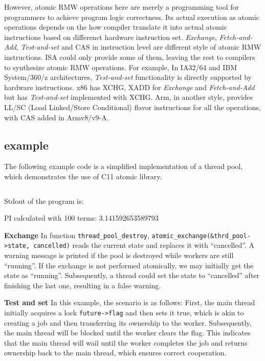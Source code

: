 \documentclass[fontsize=10pt, oneside]{scrartcl}
\newcommand{\monobox}[1]{\mbox{\texttt{#1}}}
\newcommand{\clang}[1]{C}
\newcommand{\introduce}[1]{\textit{#1}}
\begin{document}
However, atomic \textsc{RMW} operations here are merely a programming tool for programmers to achieve program logic correctness. 
Its actual execution as atomic operations depends on the how compiler translate it into actual atomic instructions based on differenct hardware instruction set. 
\introduce{Exchange}, \introduce{Fetch-and-Add}, \introduce{Test-and-set} and \textsc{CAS} in instruction level are different style of atomic \textsc{RMW} instructions. 
ISA could only provide some of them, 
leaving the rest to compilers to synthesize atomic \textsc{RMW} operations. 
For example, In IA32/64 and IBM System/360/z architectures, 
\introduce{Test-and-set} functionality is directly supported by hardware instructions. 
x86 has XCHG, XADD for \introduce{Exchange} and \introduce{Fetch-and-Add} but has \introduce{Test-and-set} implemented with XCHG. 
Arm, in another style, provides LL/SC (Load Linked/Store Conditional) flavor instructions for all the operations, 
with \textsc{CAS} added in Armv8/v9-A.

\subsection{example}
\label{rmw_example}
The following example code is a simplified implementation of a thread pool, which demonstrates the use of \clang{}11 atomic library.

\inputminted{c}{./examples/rmw_example.c}

Stdout of the program is:
\begin{ccode}
PI calculated with 100 terms: 3.141592653589793
\end{ccode}

\textbf{Exchange}
In function \monobox{thread\_pool\_destroy}, \monobox{atomic\_exchange(\&thrd\_pool->state, cancelled)} reads the current state and replaces it with ``cancelled''. 
A warning message is printed if the pool is destroyed while workers are still ``running''. 
If the exchange is not performed atomically, we may initially get the state as ``running''. Subsequently, a thread could set the state to ``cancelled'' after finishing the last one, resulting in a false warning.

\textbf{Test and set}
In this example, the scenario is as follows: 
First, the main thread initially acquires a lock \monobox{future->flag} and then sets it true, 
which is akin to creating a job and then transferring its ownership to the worker. 
Subsequently, the main thread will be blocked until the worker clears the flag. 
This indicates that the main thread will wail until the worker completes the job and returns ownership back to the main thread, which ensures correct cooperation.
\end{document}
